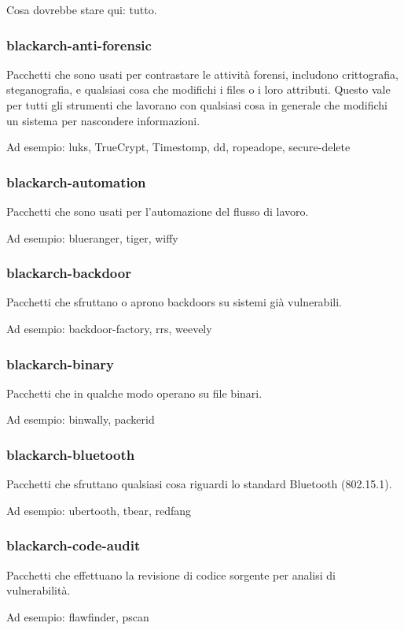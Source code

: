 \documentclass[a4paper, oneside, 11pt]{book}
\begin{document}
Cosa dovrebbe stare qui: tutto.

\subsubsection{blackarch-anti-forensic}
Pacchetti che sono usati per contrastare le attività forensi,
includono crittografia, steganografia, e qualsiasi cosa che modifichi i files o i loro attributi.
Questo vale per tutti gli strumenti che lavorano con qualsiasi cosa in generale che modifichi un sistema per nascondere informazioni.

Ad esempio: luks, TrueCrypt, Timestomp, dd, ropeadope, secure-delete

\subsubsection{blackarch-automation}
Pacchetti che sono usati per l'automazione del flusso di lavoro.

Ad esempio: blueranger, tiger, wiffy

\subsubsection{blackarch-backdoor}
Pacchetti che sfruttano o aprono backdoors su sistemi già vulnerabili.

Ad esempio: backdoor-factory, rrs, weevely

\subsubsection{blackarch-binary}
Pacchetti che in qualche modo operano su file binari.

Ad esempio: binwally, packerid

\subsubsection{blackarch-bluetooth}
Pacchetti che sfruttano qualsiasi cosa riguardi lo standard Bluetooth (802.15.1).

Ad esempio: ubertooth, tbear, redfang

\subsubsection{blackarch-code-audit}
Pacchetti che effettuano la revisione di codice sorgente per analisi di vulnerabilità.

Ad esempio: flawfinder, pscan
\end{document}

